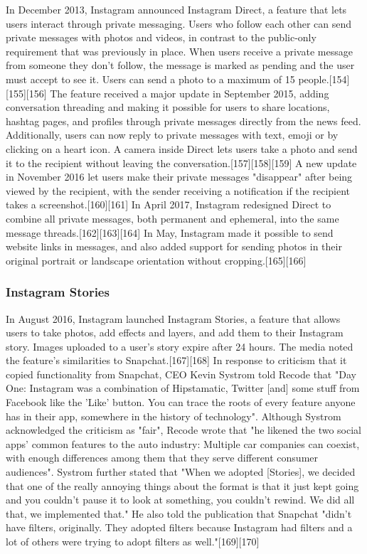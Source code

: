 \documentclass[12pt]{article}
\begin{document}
In December 2013, Instagram announced Instagram Direct, a feature that lets users interact through private messaging. Users who follow each other can send private messages with photos and videos, in contrast to the public-only requirement that was previously in place. When users receive a private message from someone they don't follow, the message is marked as pending and the user must accept to see it. Users can send a photo to a maximum of 15 people.[154][155][156] The feature received a major update in September 2015, adding conversation threading and making it possible for users to share locations, hashtag pages, and profiles through private messages directly from the news feed. Additionally, users can now reply to private messages with text, emoji or by clicking on a heart icon. A camera inside Direct lets users take a photo and send it to the recipient without leaving the conversation.[157][158][159] A new update in November 2016 let users make their private messages "disappear" after being viewed by the recipient, with the sender receiving a notification if the recipient takes a screenshot.[160][161] In April 2017, Instagram redesigned Direct to combine all private messages, both permanent and ephemeral, into the same message threads.[162][163][164] In May, Instagram made it possible to send website links in messages, and also added support for sending photos in their original portrait or landscape orientation without cropping.[165][166]





\subsubsection{Instagram Stories}




In August 2016, Instagram launched Instagram Stories, a feature that allows users to take photos, add effects and layers, and add them to their Instagram story. Images uploaded to a user's story expire after 24 hours. The media noted the feature's similarities to Snapchat.[167][168] In response to criticism that it copied functionality from Snapchat, CEO Kevin Systrom told Recode that "Day One: Instagram was a combination of Hipstamatic, Twitter [and] some stuff from Facebook like the 'Like' button. You can trace the roots of every feature anyone has in their app, somewhere in the history of technology". Although Systrom acknowledged the criticism as "fair", Recode wrote that "he likened the two social apps' common features to the auto industry: Multiple car companies can coexist, with enough differences among them that they serve different consumer audiences". Systrom further stated that "When we adopted [Stories], we decided that one of the really annoying things about the format is that it just kept going and you couldn't pause it to look at something, you couldn't rewind. We did all that, we implemented that." He also told the publication that Snapchat "didn't have filters, originally. They adopted filters because Instagram had filters and a lot of others were trying to adopt filters as well."[169][170]
\end{document}
